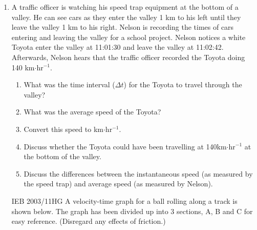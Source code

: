 \begin{enumerate}[noitemsep, label=\textbf{\arabic*}. ]
\begin{enumerate}[noitemsep, label=\textbf{\alph*}. ]
\end{enumerate}
                \label{m38796*uid220}\item A traffic officer is watching his speed trap equipment at the bottom of a valley. He can see cars as they enter the valley 1 km to his left until they leave the valley 1 km to his right. Nelson is recording the times of cars entering and leaving the valley for a school project.
Nelson notices a white Toyota enter the valley at 11:01:30 and leave the valley at 11:02:42. Afterwards, Nelson hears that the traffic officer recorded the Toyota doing 140 km\begin{math}\ensuremath{\cdot}\end{math}hr\begin{math}{}^{-1}\end{math}.
\label{m38796*id82652}\begin{enumerate}[noitemsep, label=\textbf{\alph*}. ] 
            \label{m38796*uid221}\item What was the time interval (\begin{math}\Delta t\end{math}) for the Toyota to travel through the valley?
\label{m38796*uid222}\item What was the average speed of the Toyota?
\label{m38796*uid223}\item Convert this speed to km\begin{math}\ensuremath{\cdot}\end{math}hr\begin{math}{}^{-1}\end{math}.
\label{m38796*uid224}\item Discuss whether the Toyota could have been travelling at 140km\begin{math}\ensuremath{\cdot}\end{math}hr\begin{math}{}^{-1}\end{math} at the bottom of the valley.
\label{m38796*uid225}\item Discuss the differences between the instantaneous speed (as measured by the speed trap) and average speed (as measured by Nelson).
\end{enumerate}
                \label{m38796*uid226}\item [IEB 2003/11HG] A velocity-time graph for a ball rolling along a track is shown below. The graph has been divided up into 3 sections, A, B and C for easy reference. (Disregard any effects of friction.)


\end{enumerate}
